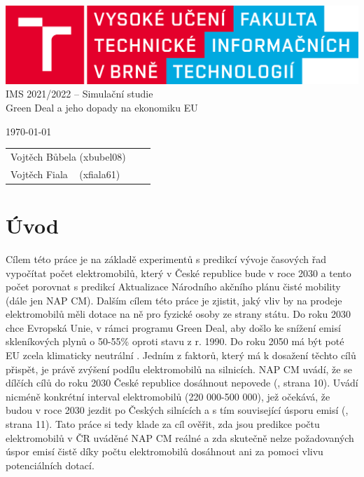 \documentclass[14pt]{extarticle}
\begin{document}
	\begin{titlepage}
		\begin{center}
			\includegraphics[scale=0.15]{fit_logo.png}
			\\
			{\Large
			\huge{{IMS 2021/2022 -- Simulační studie\\[0.5em]}}}
				 \LARGE{Green Deal a jeho dopady na ekonomiku EU\\}
		\end{center}
		
		{\Large
		    \today
			\hfill
			\begin{tabular}{l c r}
            Vojtěch Bůbela (xbubel08)\hspace{1.03em}\\
            Vojtěch Fiala \,\,\,\,\,(xfiala61)
            \end{tabular}
		}
		
	\end{titlepage}
	
	\section{Úvod}
	
	Cílem této práce je na základě experimentů s predikcí vývoje časových řad vypočítat počet elektromobilů, který v České republice bude v roce 2030 a tento počet porovnat s predikcí Aktualizace Národního akčního plánu čisté mobility \cite{NAP} (dále jen NAP CM). Dalším cílem této práce je zjistit, jaký vliv by na prodeje elektromobilů měli dotace na ně pro fyzické osoby ze strany státu. Do roku 2030 chce Evropská Unie, v rámci programu Green Deal, aby došlo ke snížení emisí skleníkových plynů o 50-55\% oproti stavu z r. 1990. Do roku 2050 má být poté EU zcela klimaticky neutrální \cite{GD}. Jedním z faktorů, který má k dosažení těchto cílů přispět, je právě zvýšení podílu elektromobilů na silnicích. NAP CM uvádí, že se dílčích cílů do roku 2030 České republice dosáhnout nepovede (\cite{NAP}, strana 10). Uvádí nicméně konkrétní interval elektromobilů (220 000-500 000), jež očekává, že budou v roce 2030 jezdit po Českých silnících a s tím související úsporu emisí (\cite{NAP}, strana 11). Tato práce si tedy klade za cíl ověřit, zda jsou predikce počtu elektromobilů v ČR uváděné NAP CM reálné a zda skutečně nelze požadovaných úspor emisí čistě díky počtu elektromobilů dosáhnout ani za pomoci vlivu potenciálních dotací.
	
\end{document}
